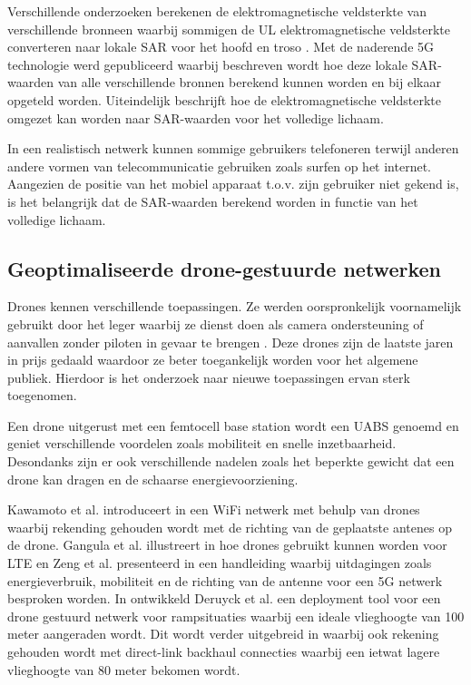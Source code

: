 \documentclass[twocolumn]{phdsymp_dutch}
\begin{document}
Verschillende onderzoeken berekenen de elektromagnetische veldsterkte van verschillende bronneen \cite{J6_originalExposureFormula,J1,J10_RDP,J10.1} 
waarbij sommigen de \gls{UL} elektromagnetische veldsterkte converteren naar lokale \gls{SAR} voor het hoofd en troso \cite{J10_RDP,J10.1}. 
Met de naderende 5G technologie werd \cite{J17_kuehn2019modelling} gepubliceerd waarbij beschreven wordt hoe 
deze lokale  \gls{SAR}-waarden van alle verschillende bronnen berekend kunnen worden en bij elkaar opgeteld worden.
Uiteindelijk beschrijft \cite{J22_plets2015joint} hoe de elektromagnetische veldsterkte omgezet kan worden 
naar \gls{SAR}-waarden voor het volledige lichaam.

In een realistisch netwerk kunnen sommige gebruikers telefoneren terwijl anderen andere vormen van telecommunicatie gebruiken zoals 
surfen op het internet. Aangezien de positie van het mobiel apparaat t.o.v. zijn gebruiker niet gekend is,
is het belangrijk dat de \gls{SAR}-waarden berekend worden in functie van het volledige lichaam. 

\subsection{Geoptimaliseerde drone-gestuurde netwerken}

Drones kennen verschillende toepassingen. Ze werden oorspronkelijk voornamelijk gebruikt door het leger waarbij ze dienst doen  
als camera ondersteuning of aanvallen zonder piloten in gevaar te brengen \cite{U12}. 
Deze drones zijn de laatste jaren in prijs gedaald waardoor ze beter toegankelijk worden
voor het algemene publiek. Hierdoor is het onderzoek naar nieuwe toepassingen ervan sterk toegenomen.

Een drone uitgerust met een femtocell base station wordt een \gls{UABS} genoemd en 
geniet verschillende voordelen zoals mobiliteit en snelle inzetbaarheid.
Desondanks zijn er ook verschillende nadelen zoals het beperkte gewicht dat een drone kan dragen 
en de schaarse energievoorziening.

Kawamoto et al. introduceert in \cite{U11} een WiFi netwerk  met behulp van drones waarbij rekending gehouden wordt
met de richting van de geplaatste antenes op de drone. 
Gangula et al. illustreert in \cite{U10} hoe drones gebruikt kunnen worden voor \gls{LTE}
en
Zeng et al. presenteerd in  \cite{U12} een handleiding waarbij uitdagingen   zoals energieverbruik, mobiliteit en 
de richting van de antenne voor een 5G netwerk besproken worden. 
In \cite{J2} ontwikkeld Deruyck et al. een deployment tool voor een drone gestuurd netwerk voor rampsituaties waarbij 
een ideale vlieghoogte van 100 meter aangeraden wordt.  
Dit wordt verder uitgebreid in \cite{U1} waarbij ook rekening gehouden wordt met 
 direct-link backhaul connecties waarbij een ietwat lagere vlieghoogte van 80 meter bekomen wordt.
\end{document}
